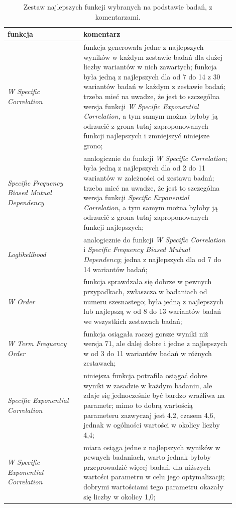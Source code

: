 \documentclass[11pt,a4paper]{llncs}
\begin{document}
\begin{table}[h!]
\centering
\begin{tabular}{ p{0.3\linewidth} | p{0.6\linewidth} }
	\toprule
	\textbf{funkcja}	& \textbf{komentarz}	\\
	\midrule
	\emph{W Specific Correlation}	& funkcja generowała jedne z najlepszych wyników w każdym zestawie badań dla dużej liczby wariantów w nich zawartych; funkcja była jedną z najlepszych dla od 7 do 14 z 30 wariantów badań w każdym z zestawie badań; trzeba mieć na uwadze, że jest to szczególna wersja funkcji \emph{W Specific Exponential Correlation}, a tym samym można byłoby ją odrzucić z grona tutaj zaproponowanych funkcji najlepszych i zmniejszyć niniejsze grono; \\
	\hline
	\emph{Specific Frequency Biased Mutual Dependency}	& analogicznie do funkcji \emph{W Specific Correlation}; była jedną z najlepszych dla od 2 do 11 wariantów w zależności od zestawu badań; trzeba mieć na uwadze, że jest to szczególna wersja funkcji \emph{Specific Exponential Correlation}, a tym samym można byłoby ją odrzucić z grona tutaj zaproponowanych funkcji najlepszych; \\
	\hline
	\emph{Loglikelihood}	& analogicznie do funkcji \emph{W Specific Correlation} i \emph{Specific Frequency Biased Mutual Dependency}; jedna z najlepszych dla od 7 do 14 wariantów badań;\\
	\hline
	\emph{W Order}	& funkcja sprawdzała się dobrze w pewnych przypadkach, zwłaszcza w badaniach od numeru szesnastego; była jedną z najlepszych lub najlepszą w od 8 do 13 wariantów badań we wszystkich zestawach badań;\\
	\hline
	\emph{W Term Frequency Order}	& funkcja osiągała raczej gorsze wyniki niż wersja 71, ale dalej dobre i jedne z najlepszych w od 3 do 11 wariantów badań w różnych zestawach;\\
	\hline
	\emph{Specific Exponential Correlation}	& niniejsza funkcja potrafiła osiągać dobre wyniki w zasadzie w każdym badaniu, ale zdaje się jednocześnie być bardzo wrażliwa na parametr; mimo to dobrą wartością parameteru zazwyczaj jest 4,2, czasem 4,6, jednak w ogólności wartości w okolicy liczby 4,4; \\
	\hline
	\emph{W Specific Exponential Correlation}	& miara osiąga jedne z najlepszych wyników w pewnych badaniach, warto jednak byłoby przeprowadzić więcej badań, dla niższych wartości parametru w celu jego optymalizacji; dobrymi wartościami tego parametru okazały się liczby w okolicy 1,0;\\
	\bottomrule
\end{tabular}
\caption[Zestaw najlepszych funkcji wybranych na podstawie badań, z komentarzami]{Zestaw najlepszych funkcji wybranych na podstawie badań, z komentarzami.}
\label{ending_best_measures}
\end{table}
\end{document}
